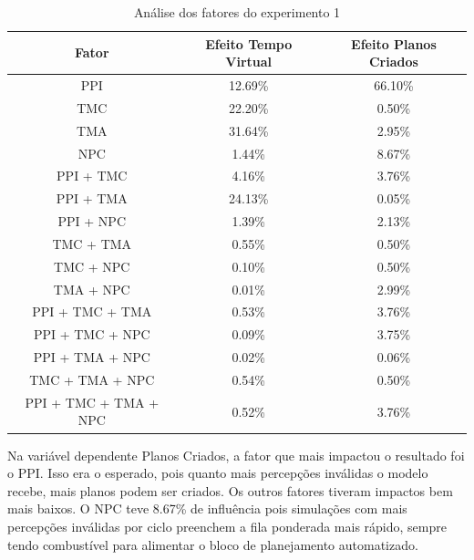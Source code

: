 \begin{table}
    \begin{center}
        \caption{Análise dos fatores do experimento 1}
        \label{tab:experimento1fatores}
        \begin{tabular}{ |c|c|c| }
            \hline
            \textbf{Fator} & \textbf{Efeito Tempo Virtual} & \textbf{Efeito Planos Criados}\\  
            \hline
            PPI & 12.69\% & 66.10\%\\
            \hline
            TMC & 22.20\% & 0.50\%\\
            \hline
            TMA & 31.64\% & 2.95\%\\
            \hline
            NPC & 1.44\% & 8.67\%\\
            \hline
            PPI + TMC & 4.16\% & 3.76\%\\
            \hline
            PPI + TMA & 24.13\% & 0.05\%\\
            \hline
            PPI + NPC & 1.39\% & 2.13\%\\
            \hline
            TMC + TMA & 0.55\% & 0.50\%\\
            \hline
            TMC + NPC & 0.10\% & 0.50\%\\
            \hline
            TMA + NPC & 0.01\% & 2.99\%\\
            \hline
            PPI + TMC + TMA & 0.53\% & 3.76\%\\
            \hline
            PPI + TMC + NPC & 0.09\% & 3.75\%\\
            \hline
            PPI + TMA + NPC & 0.02\% & 0.06\%\\
            \hline
            TMC + TMA + NPC & 0.54\% & 0.50\%\\
            \hline
            PPI + TMC + TMA + NPC & 0.52\% & 3.76\%\\
            \hline
        \end{tabular}{}
    \end{center}{}
\end{table}


Na variável dependente Planos Criados, a fator que mais impactou o resultado foi o PPI. Isso era o esperado, pois quanto mais percepções inválidas o modelo recebe, mais planos podem ser criados. Os outros fatores tiveram impactos bem mais baixos. O NPC teve 8.67\% de influência pois simulações com mais percepções inválidas por ciclo preenchem a fila ponderada mais rápido, sempre tendo combustível para alimentar o bloco de planejamento automatizado.

